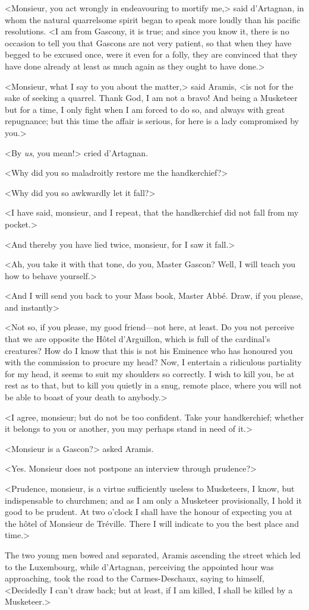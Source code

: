 <Monsieur, you act wrongly in endeavouring to mortify me,> said d'Artagnan, in whom the natural quarrelsome spirit began to speak more loudly than his pacific resolutions. <I am from Gascony, it is true; and since you know it, there is no occasion to tell you that Gascons are not very patient, so that when they have begged to be excused once, were it even for a folly, they are convinced that they have done already at least as much again as they ought to have done.> 

<Monsieur, what I say to you about the matter,> said Aramis, <is not for the sake of seeking a quarrel. Thank God, I am not a bravo! And being a Musketeer but for a time, I only fight when I am forced to do so, and always with great repugnance; but this time the affair is serious, for here is a lady compromised by you.> 

<By \textit{us}, you mean!> cried d'Artagnan. 

<Why did you so maladroitly restore me the handkerchief?> 

<Why did you so awkwardly let it fall?> 

<I have said, monsieur, and I repeat, that the handkerchief did not fall from my pocket.> 

<And thereby you have lied twice, monsieur, for I saw it fall.> 

<Ah, you take it with that tone, do you, Master Gascon? Well, I will teach you how to behave yourself.> 

<And I will send you back to your Mass book, Master Abbé. Draw, if you please, and instantly\longdash> 

<Not so, if you please, my good friend---not here, at least. Do you not perceive that we are opposite the Hôtel d'Arguillon, which is full of the cardinal's creatures? How do I know that this is not his Eminence who has honoured you with the commission to procure my head? Now, I entertain a ridiculous partiality for my head, it seems to suit my shoulders so correctly. I wish to kill you, be at rest as to that, but to kill you quietly in a snug, remote place, where you will not be able to boast of your death to anybody.> 

<I agree, monsieur; but do not be too confident. Take your handkerchief; whether it belongs to you or another, you may perhaps stand in need of it.> 

<Monsieur is a Gascon?> asked Aramis. 

<Yes. Monsieur does not postpone an interview through prudence?> 

<Prudence, monsieur, is a virtue sufficiently useless to Musketeers, I know, but indispensable to churchmen; and as I am only a Musketeer provisionally, I hold it good to be prudent. At two o'clock I shall have the honour of expecting you at the hôtel of Monsieur de Tréville. There I will indicate to you the best place and time.> 

The two young men bowed and separated, Aramis ascending the street which led to the Luxembourg, while d'Artagnan, perceiving the appointed hour was approaching, took the road to the Carmes-Deschaux, saying to himself, <Decidedly I can't draw back; but at least, if I am killed, I shall be killed by a Musketeer.> 
